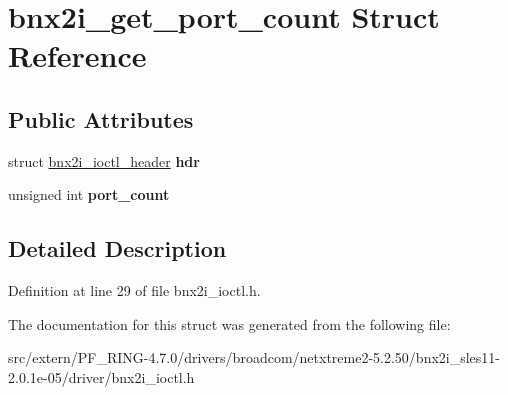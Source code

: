 \hypertarget{structbnx2i__get__port__count}{
\section{bnx2i\_\-get\_\-port\_\-count Struct Reference}
\label{structbnx2i__get__port__count}
}
\subsection*{Public Attributes}
\begin{DoxyCompactItemize}
\item 
\hypertarget{structbnx2i__get__port__count_af8dab29548634bface4deff6abfbd3d5}{
struct \hyperlink{structbnx2i__ioctl__header}{bnx2i\_\-ioctl\_\-header} {\bfseries hdr}}
\label{structbnx2i__get__port__count_af8dab29548634bface4deff6abfbd3d5}

\item 
\hypertarget{structbnx2i__get__port__count_ad4bbd398be1517c1ead4bec3dbd5ec66}{
unsigned int {\bfseries port\_\-count}}
\label{structbnx2i__get__port__count_ad4bbd398be1517c1ead4bec3dbd5ec66}

\end{DoxyCompactItemize}


\subsection{Detailed Description}


Definition at line 29 of file bnx2i\_\-ioctl.h.



The documentation for this struct was generated from the following file:\begin{DoxyCompactItemize}
\item 
src/extern/PF\_\-RING-\/4.7.0/drivers/broadcom/netxtreme2-\/5.2.50/bnx2i\_\-sles11-\/2.0.1e-\/05/driver/bnx2i\_\-ioctl.h\end{DoxyCompactItemize}
